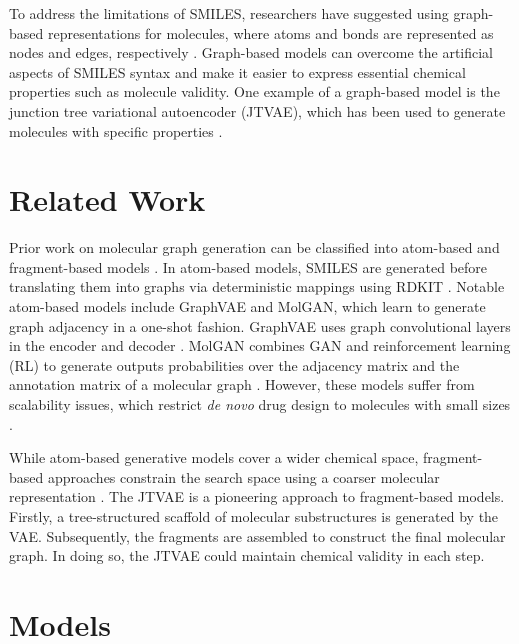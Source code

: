 To address the limitations of SMILES, researchers have suggested using graph-based representations for molecules, where atoms and bonds are represented as nodes and edges, respectively \cite{meyers2021novo, sousa2021generative, li2018multi}. Graph-based models can overcome the artificial aspects of SMILES syntax and make it easier to express essential chemical properties such as molecule validity. One example of a graph-based model is the junction tree variational autoencoder (JTVAE), which has been used to generate molecules with specific properties \cite{jin2018junction}.

\section{Related Work}
Prior work on molecular graph generation can be classified into atom-based and fragment-based models \cite{meyers2021novo}. In atom-based models, SMILES are generated before translating them into graphs via deterministic mappings using RDKIT \cite{landrum2013rdkit}. Notable atom-based models include GraphVAE and MolGAN, which learn to generate graph adjacency in a one-shot fashion. GraphVAE uses graph convolutional layers in the encoder and decoder \cite{simonovsky2018graphvae}. MolGAN combines GAN and reinforcement learning (RL) to generate outputs probabilities over the adjacency matrix and the annotation matrix of a molecular graph \cite{de2018molgan}. However, these models suffer from scalability issues, which restrict \textit{de novo} drug design to molecules with small sizes \cite{li2018multi}.

While atom-based generative models cover a wider chemical space, fragment-based approaches constrain the search space using a coarser molecular representation \cite{meyers2021novo}. The JTVAE is a pioneering approach to fragment-based models\cite{jin2018junction}. Firstly, a tree-structured scaffold of molecular substructures is generated by the VAE. Subsequently, the fragments are assembled to construct the final molecular graph. In doing so, the JTVAE could maintain chemical validity in each step. 

\section{Models}
